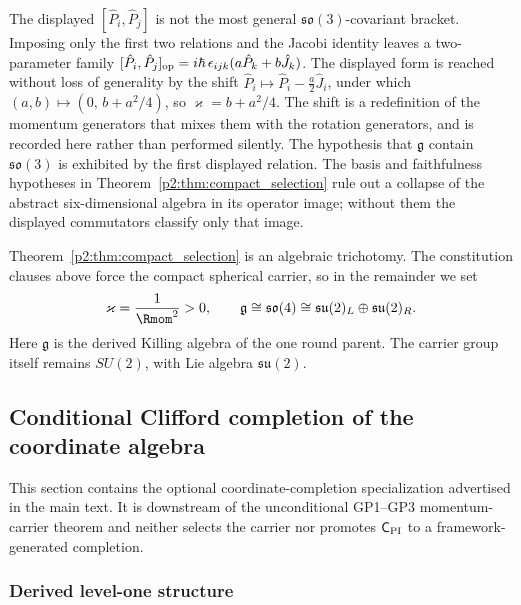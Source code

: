 \documentclass[11pt,a4paper]{article}
\begin{document}
\begin{remark}
\label{p2:rem:bracket-generality}
The displayed \([\hat P_i,\hat P_j]\) is not the most general
\(\mathfrak{so}(3)\)-covariant bracket.  Imposing only the first two relations
and the Jacobi identity leaves a two-parameter family
\([\hat P_i,\hat P_j]_{\rm op}=i\hbar\,\epsilon_{ijk}(a\hat P_k+b\hat J_k)\).
The displayed form is reached without loss of generality by the shift
\(\hat P_i\mapsto\hat P_i-\tfrac a2\hat J_i\), under which
\((a,b)\mapsto(0,\,b+a^2/4)\), so \(\varkappa=b+a^2/4\).  The shift is a
redefinition of the momentum generators that mixes them with the rotation
generators, and is recorded here rather than performed silently.
The hypothesis that \(\mathfrak g\) contain \(\mathfrak{so}(3)\) is exhibited
by the first displayed relation.  The basis and faithfulness hypotheses in
Theorem~\ref{p2:thm:compact_selection} rule out a collapse of the abstract
six-dimensional algebra in its operator image; without them the displayed
commutators classify only that image.
\end{remark}

\begin{remark}
\label{p2b:rem:compact-branch-legacy}
Theorem~\ref{p2:thm:compact_selection} is an algebraic trichotomy. The constitution clauses above force the compact spherical carrier, so in the remainder we set
\[
\varkappa=\frac{1}{\Rmom^2}>0,
\qquad
\mathfrak{g}\cong \mathfrak{so}(4)\cong \mathfrak{su}(2)_L\oplus\mathfrak{su}(2)_R.
\]
Here \(\mathfrak g\) is the derived Killing algebra of the one round parent.
The carrier group itself remains \(SU(2)\), with Lie algebra
\(\mathfrak{su}(2)\).
\end{remark}


\subsection{Conditional Clifford completion of the coordinate algebra}
\label{p2b:app:conditional-clifford-package}
This section contains the optional coordinate-completion specialization
advertised in the main text.  It is downstream of the unconditional
GP1--GP3 momentum-carrier theorem and neither selects the carrier nor promotes
\(\mathsf C_{\rm PI}\) to a framework-generated completion.

\subsubsection{Derived level-one structure}
\label{p2:subsec:m1-distinguished}
\end{document}

